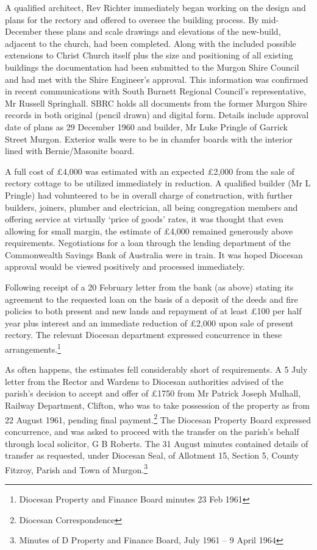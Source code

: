 A qualified architect, Rev Richter immediately began working on the design and plans for the rectory and offered to oversee the building process. By mid-December these plans and scale drawings and elevations of the new-build, adjacent to the church, had been completed. Along with the included possible extensions to Christ Church itself plus the size and positioning of all existing buildings the documentation had been submitted to the Murgon Shire Council and had met with the Shire Engineer's approval. This information was confirmed in recent communications with South Burnett Regional Council's representative, Mr Russell Springhall. SBRC holds all documents from the former Murgon Shire records in both original (pencil drawn) and digital form. Details include approval date of plans as 29 December 1960 and builder, Mr Luke Pringle of Garrick Street Murgon. Exterior walls were to be in chamfer boards with the interior lined with Bernie/Masonite board.



A full cost of \pounds4,000 was estimated with an expected \pounds2,000 from the sale of rectory cottage to be utilized immediately in reduction. A qualified builder (Mr L Pringle) had volunteered to be in overall charge of construction, with further builders, joiners, plumber and electrician, all being congregation members and offering service at virtually `price of goods' rates, it was thought that even allowing for small margin, the estimate of \pounds4,000 remained generously above requirements. Negotiations for a loan through the lending department of the Commonwealth Savings Bank of Australia were in train. It was hoped Diocesan approval would be viewed positively and processed immediately.



Following receipt of a 20 February letter from the bank (as above) stating its agreement to the requested loan on the basis of a deposit of the deeds and fire policies to both present and new lands and repayment of at least \pounds100 per half year plus interest and an immediate reduction of \pounds2,000 upon sale of present rectory. The relevant Diocesan department expressed concurrence in these arrangements.\footnote{Diocesan Property and Finance Board minutes 23 Feb 1961}


As often happens, the estimates fell considerably short of requirements. A 5 July letter from the Rector and Wardens to Diocesan authorities advised of the parish's decision to accept and offer of \pounds1750 from Mr Patrick Joseph Mulhall, Railway Department, Clifton, who was to take possession of the property as from 22 August 1961, pending final payment.\footnote{Diocesan Correspondence} The Diocesan Property Board expressed concurrence, and was asked to proceed with the transfer on the parish's behalf through local solicitor, G B Roberts. The 31 August minutes contained details of transfer as requested, under Diocesan Seal, of Allotment 15, Section 5, County Fitzroy, Parish and Town of Murgon.\footnote{Minutes of D Property and Finance Board, July 1961 -- 9 April 1964}


